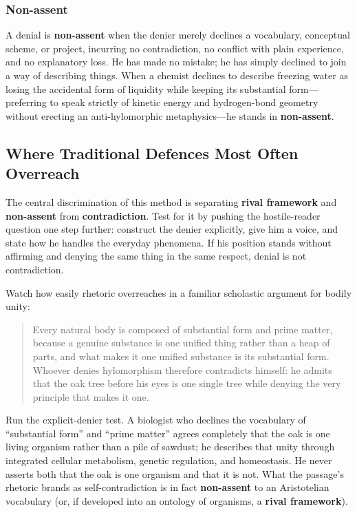 \subsubsection*{Non-assent}

A denial is \textbf{non-assent} when the denier merely declines a vocabulary, conceptual scheme, or project, incurring no contradiction, no conflict with plain experience, and no explanatory loss. He has made no mistake; he has simply declined to join a way of describing things. When a chemist declines to describe freezing water as losing the accidental form of liquidity while keeping its substantial form---preferring to speak strictly of kinetic energy and hydrogen-bond geometry without erecting an anti-hylomorphic metaphysics---he stands in \textbf{non-assent}.

\subsection{Where Traditional Defences Most Often Overreach}

The central discrimination of this method is separating \textbf{rival framework} and \textbf{non-assent} from \textbf{contradiction}. Test for it by pushing the hostile-reader question one step further: construct the denier explicitly, give him a voice, and state how he handles the everyday phenomena. If his position stands without affirming and denying the same thing in the same respect, denial is not contradiction.

Watch how easily rhetoric overreaches in a familiar scholastic argument for bodily unity:

\begin{quote}
Every natural body is composed of substantial form and prime matter, because a genuine substance is one unified thing rather than a heap of parts, and what makes it one unified substance is its substantial form. Whoever denies hylomorphism therefore contradicts himself: he admits that the oak tree before his eyes is one single tree while denying the very principle that makes it one.
\end{quote}

Run the explicit-denier test. A biologist who declines the vocabulary of ``substantial form'' and ``prime matter'' agrees completely that the oak is one living organism rather than a pile of sawdust; he describes that unity through integrated cellular metabolism, genetic regulation, and homeostasis. He never asserts both that the oak is one organism and that it is not. What the passage's rhetoric brands as self-contradiction is in fact \textbf{non-assent} to an Aristotelian vocabulary (or, if developed into an ontology of organisms, a \textbf{rival framework}).

